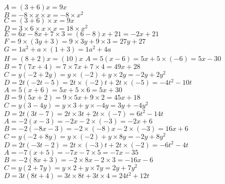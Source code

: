 \documentclass[a4paper,11pt,fleqn]{article}		%
\begin{document}
\begin{correction}
\begin{multicols}{2}
$A=(3  +6) x=9 x$\\
$B=-8 \times x\times x=-8 \times x^2$\\
$C=(3 +6) \times x=9  x$\\
$D=3\times 6\times x\times x=18\times x^2$\\
$E= 6  x -8 x +7\times 3 = (6  -8) x +21 = -2 x +21 $\\
$F=9 \times (3y +3)  =9 \times 3y +9 \times 3
 =27y +27 $\\
$G=1 a^2+a\times (1+ 3)=1 a^2+4a$\\
$H= (8 +2)x = (10)x$
$A=  5 (x  -6)=  5 x +5 \times (-6)=  5 x -30$\\
$B= 7 ( 7 x    +4)= 7 \times 7 x  +7 \times  4= 49 x  +28$\\
$C=y( -2  +2 y)=y \times (-2) + y \times 2 y=-2 y + 2 y^2$\\
$D= 2  t(  -2 t -5)= 2  t \times (-2) t +2  t \times (-5) = -4  t^2  -10  t  $
$A=  5 (x  +6)=  5 x +5 \times 6=  5 x +30$\\
$B= 9 ( 5 x    +2)= 9 \times 5 x  +9 \times  2= 45 x  +18$\\
$C=y( 3  -4 y)=y \times 3 + y \times -4 y=3 y + -4 y^2$\\
$D= 2  t(  3 t -7)= 2  t \times 3 t +2  t \times (-7) = 6  t^2  -14  t  $
$A=  -2 (x  -3)=  -2 x -2 \times (-3)=  -2 x +6$\\
$B= -2 ( -8 x    -3)= -2 \times (-8) x  -2 \times  (-3)= 16 x  +6$\\
$C=y( -2  +8 y)=y \times (-2) + y \times 8 y=-2 y + 8 y^2$\\
$D= 2  t(  -3 t -2)= 2  t \times (-3) t +2  t \times (-2) = -6  t^2  -4  t  $
$A=  -7 (x  +5)=  -7 x -7 \times 5=  -7 x -35$\\
$B= -2 ( 8 x    +3)= -2 \times 8 x  -2 \times  3= -16 x  -6$\\
$C=y( 2  +7 y)=y \times 2 + y \times 7 y=2 y + 7 y^2$\\
$D= 3  t(  8 t +4)= 3  t \times 8 t +3  t \times 4 = 24  t^2  +12  t  $


\end{multicols}
\end{correction}
\end{document}
